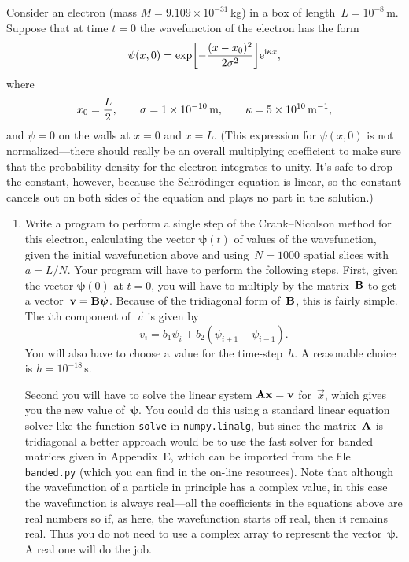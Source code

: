 \documentclass[12pt]{article}
\begin{document}
\begin{exercises}
Consider an electron (mass $M=9.109\times10^{-31}\,$kg) in a box of
length~$L=10^{-8}\,$m.  Suppose that at time $t=0$ the wavefunction of the
electron has the form
\begin{displaymath}
\psi(x,0) = \exp \biggl[ -{(x-x_0)^2\over2\sigma^2} \biggr]
            \mathrm{e}^{\mathrm{i}\kappa x},
\end{displaymath}
where
\begin{displaymath}
x_0 = {L\over2},\qquad
\sigma = 1\times10^{-10}\,\mathrm{m},\qquad
\kappa = 5\times10^{10}\,\mathrm{m}^{-1},
\end{displaymath}
and $\psi=0$ on the walls at $x=0$ and $x=L$.  (This expression for
$\psi(x,0)$ is not normalized---there should really be an overall
multiplying coefficient to make sure that the probability density for the
electron integrates to unity.  It's safe to drop the constant, however,
because the Schr\"odinger equation is linear, so the constant cancels out
on both sides of the equation and plays no part in the solution.)

\begin{enumerate}\setlength{\itemsep}{0pt}
\item Write a program to perform a single step of the
  Crank--Nicolson method for this electron, calculating the vector
  $\boldsymbol{\psi}(t)$ of values of the wavefunction, given the initial
  wavefunction above and using~$N=1000$ spatial slices with $a=L/N$.  Your
  program will have to perform the following steps.  First, given the
  vector $\boldsymbol{\psi}(0)$ at $t=0$, you will have to multiply by the
  matrix~$\mathbf{B}$ to get a vector~$\mathbf{v} = \mathbf{B}\boldsymbol{\psi}$.
  Because of the tridiagonal form of~$\mathbf{B}$, this is fairly simple.  The
  $i$th component of~$\vec{v}$ is given by
\begin{displaymath}
v_i = b_1\psi_i + b_2(\psi_{i+1}+\psi_{i-1}).
\end{displaymath}
You will also have to choose a value for the time-step~$h$.  A reasonable
choice is $h=10^{-18}\,$s.

Second you will have to solve the linear system $\mathbf{A}\mathbf{x}=\mathbf{v}$
for~$\vec{x}$, which gives you the new value of~$\boldsymbol{\psi}$.  You
could do this using a standard linear equation solver like the function
\verb|solve| in \verb|numpy.linalg|, but since the matrix~$\mathbf{A}$ is
tridiagonal a better approach would be to use the fast solver for banded
matrices given in Appendix~E, which can be imported from the file
\verb|banded.py| (which you can find in the on-line resources).  Note that
although the wavefunction of a particle in principle has a complex value,
in this case the wavefunction is always real---all the coefficients in the
equations above are real numbers so if, as here, the wavefunction starts
off real, then it remains real.  Thus you do not need to use a complex
array to represent the vector~$\boldsymbol{\psi}$.  A real one will do the
job.


\end{enumerate}
\end{exercises}
\end{document}
